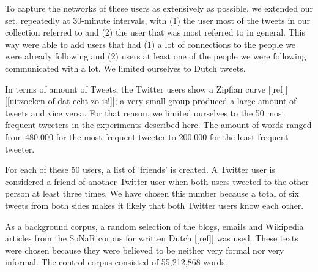 \documentclass[11pt]{article}
\begin{document}
To capture the networks of these users as extensively as possible, we extended our set, repeatedly at 30-minute intervals, with (1) the user most of the tweets in our collection referred to and (2) the user that was most referred to in general. This way were able to add users that had (1) a lot of connections to the people we were already following and (2) users at least one of the people we were following communicated with a lot. We limited ourselves to Dutch tweets.

In terms of amount of Tweets, the Twitter users show a Zipfian curve [[ref]]  [[uitzoeken of dat echt zo is!]]; a very small group produced a large amount of tweets and vice versa. For that reason, we limited ourselves to the 50 most frequent tweeters in the experiments described here. The amount of words ranged from 480.000 for the most frequent tweeter to 200.000 for the least frequent tweeter.

For each of these 50 users, a list of 'friends' is created. A Twitter user is considered a friend of another Twitter user when both users tweeted to the other person at least three times. We have chosen this number because a total of six tweets from both sides makes it likely that both Twitter users know each other. 

As a background corpus, a random selection of the blogs, emails and Wikipedia articles from the SoNaR corpus for written Dutch [[ref]] was used. These texts were chosen because they were believed to be neither very formal nor very informal. The control corpus consisted of 55,212,868 words.
\end{document}
